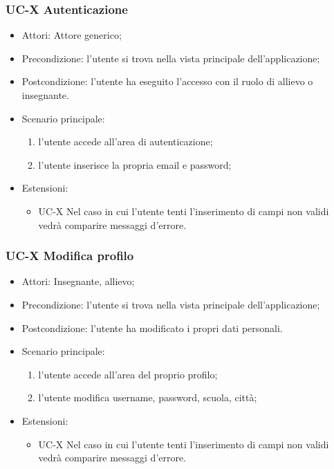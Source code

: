 
	\subsubsection{UC-X Autenticazione}
		\begin{itemize}
			\item Attori: Attore generico;
			\item Precondizione: l'utente si trova nella vista principale dell'applicazione;
			\item Postcondizione: l'utente ha eseguito l'accesso con il ruolo di allievo o insegnante.
			\item Scenario principale:
				\begin{enumerate}
					\item l'utente accede all'area di autenticazione;
					\item l'utente inserisce la propria email e password;
				\end{enumerate}
				\item Estensioni:
				\begin{itemize}
					\item UC-X Nel caso in cui l'utente tenti l'inserimento di campi non validi vedrà comparire messaggi d'errore.
				\end{itemize}
		\end{itemize}
		
	\subsubsection{UC-X Modifica profilo}
		\begin{itemize}
			\item Attori: Insegnante, allievo;
			\item Precondizione: l'utente si trova nella vista principale dell'applicazione;
			\item Postcondizione: l'utente ha modificato i propri dati personali.
			\item Scenario principale:
				\begin{enumerate}
					\item l'utente accede all'area del proprio profilo;
					\item l'utente modifica username, password, scuola, città;
				\end{enumerate}
				\item Estensioni:
				\begin{itemize}
					\item UC-X Nel caso in cui l'utente tenti l'inserimento di campi non validi vedrà comparire messaggi d'errore.
				\end{itemize}
		\end{itemize}
		

